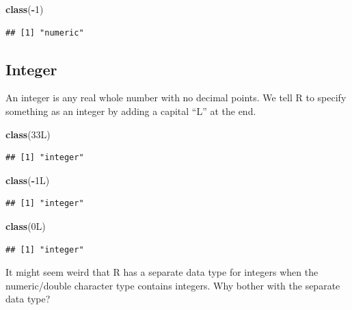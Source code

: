 \documentclass[
]{book}
\newenvironment{Shaded}{\begin{snugshade}}{\end{snugshade}}
\newcommand{\DecValTok}[1]{\textcolor[rgb]{0.00,0.00,0.81}{#1}}
\newcommand{\FunctionTok}[1]{\textcolor[rgb]{0.13,0.29,0.53}{\textbf{#1}}}
\newcommand{\NormalTok}[1]{#1}
\newcommand{\SpecialCharTok}[1]{\textcolor[rgb]{0.81,0.36,0.00}{\textbf{#1}}}
\begin{document}
\begin{Shaded}
\begin{Highlighting}[]
\FunctionTok{class}\NormalTok{(}\SpecialCharTok{{-}}\DecValTok{1}\NormalTok{)}
\end{Highlighting}
\end{Shaded}

\begin{verbatim}
## [1] "numeric"
\end{verbatim}

\hypertarget{integer}{%
\subsection{Integer}\label{integer}}

An integer is any real whole number with no decimal points. We tell R to specify something as an integer by adding a capital ``L'' at the end.

\begin{Shaded}
\begin{Highlighting}[]
\FunctionTok{class}\NormalTok{(33L)}
\end{Highlighting}
\end{Shaded}

\begin{verbatim}
## [1] "integer"
\end{verbatim}

\begin{Shaded}
\begin{Highlighting}[]
\FunctionTok{class}\NormalTok{(}\SpecialCharTok{{-}}\NormalTok{1L)}
\end{Highlighting}
\end{Shaded}

\begin{verbatim}
## [1] "integer"
\end{verbatim}

\begin{Shaded}
\begin{Highlighting}[]
\FunctionTok{class}\NormalTok{(0L)}
\end{Highlighting}
\end{Shaded}

\begin{verbatim}
## [1] "integer"
\end{verbatim}

It might seem weird that R has a separate data type for integers when the numeric/double character type contains integers. Why bother with the separate data type?
\end{document}
